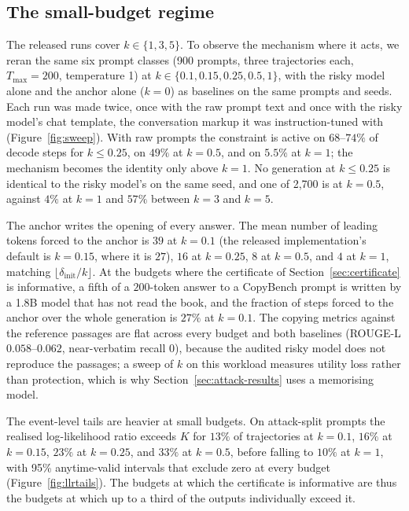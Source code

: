\subsection{The small-budget regime}\label{sec:sweep}

The released runs cover $k \in \{1, 3, 5\}$. To observe the mechanism where it acts, we reran the same six prompt classes (900 prompts, three trajectories each, $T_{\max}=200$, temperature 1) at $k \in \{0.1, 0.15, 0.25, 0.5, 1\}$, with the risky model alone and the anchor alone ($k=0$) as baselines on the same prompts and seeds. Each run was made twice, once with the raw prompt text and once with the risky model's chat template, the conversation markup it was instruction-tuned with (Figure~\ref{fig:sweep}). With raw prompts the constraint is active on $68$--$74\%$ of decode steps for $k \le 0.25$, on $49\%$ at $k=0.5$, and on $5.5\%$ at $k=1$; the mechanism becomes the identity only above $k=1$. No generation at $k \le 0.25$ is identical to the risky model's on the same seed, and one of 2{,}700 is at $k=0.5$, against $4\%$ at $k=1$ and $57\%$ between $k=3$ and $k=5$.

The anchor writes the opening of every answer. The mean number of leading tokens forced to the anchor is $39$ at $k=0.1$ (the released implementation's default is $k=0.15$, where it is $27$), $16$ at $k=0.25$, $8$ at $k=0.5$, and $4$ at $k=1$, matching $\lfloor \delta_{\mathrm{init}}/k \rfloor$. At the budgets where the certificate of Section~\ref{sec:certificate} is informative, a fifth of a $200$-token answer to a CopyBench prompt is written by a 1.8B model that has not read the book, and the fraction of steps forced to the anchor over the whole generation is $27\%$ at $k=0.1$. The copying metrics against the reference passages are flat across every budget and both baselines (ROUGE-L $0.058$--$0.062$, near-verbatim recall $0$), because the audited risky model does not reproduce the passages; a sweep of $k$ on this workload measures utility loss rather than protection, which is why Section~\ref{sec:attack-results} uses a memorising model.

The event-level tails are heavier at small budgets. On attack-split prompts the realised log-likelihood ratio exceeds $K$ for $13\%$ of trajectories at $k=0.1$, $16\%$ at $k=0.15$, $23\%$ at $k=0.25$, and $33\%$ at $k=0.5$, before falling to $10\%$ at $k=1$, with 95\% anytime-valid intervals that exclude zero at every budget (Figure~\ref{fig:llrtails}). The budgets at which the certificate is informative are thus the budgets at which up to a third of the outputs individually exceed it.


